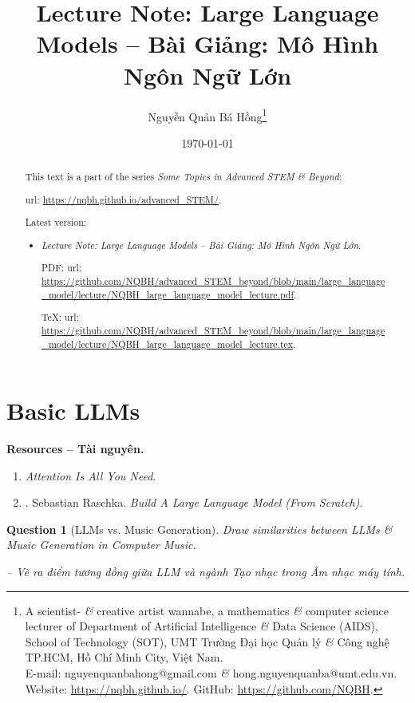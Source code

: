 \documentclass{article}
\title{Lecture Note: Large Language Models -- Bài Giảng: Mô Hình Ngôn Ngữ Lớn}
\author{Nguyễn Quản Bá Hồng\footnote{A scientist- {\it\&} creative artist wannabe, a mathematics {\it\&} computer science lecturer of Department of Artificial Intelligence {\it\&} Data Science (AIDS), School of Technology (SOT), UMT Trường Đại học Quản lý {\it\&} Công nghệ TP.HCM, Hồ Chí Minh City, Việt Nam.\\E-mail: {\sf nguyenquanbahong@gmail.com} {\it\&} {\sf hong.nguyenquanba@umt.edu.vn}. Website: \url{https://nqbh.github.io/}. GitHub: \url{https://github.com/NQBH}.}}
\date{\today}
\newtheorem{question}{Question}
\begin{document}
\maketitle
\begin{abstract}
	This text is a part of the series {\it Some Topics in Advanced STEM \& Beyond}:
	
	{\sc url}: \url{https://nqbh.github.io/advanced_STEM/}.
	
	Latest version:
	\begin{itemize}
		\item {\it Lecture Note: Large Language Models -- Bài Giảng: Mô Hình Ngôn Ngữ Lớn}.
		
		PDF: {\sc url}: \url{https://github.com/NQBH/advanced_STEM_beyond/blob/main/large_language_model/lecture/NQBH_large_language_model_lecture.pdf}.
		
		\TeX: {\sc url}: \url{https://github.com/NQBH/advanced_STEM_beyond/blob/main/large_language_model/lecture/NQBH_large_language_model_lecture.tex}.
	\end{itemize}
\end{abstract}
\tableofcontents


\section{Basic LLMs}
\textbf{\textsf{Resources -- Tài nguyên.}}
\begin{enumerate}
	\item {\it Attention Is All You Need}.
	
	\item \cite{Raschka2024}. {\sc Sebastian Raschka}. {\it Build A Large Language Model (From Scratch)}.
\end{enumerate}

\begin{question}[LLMs vs. Music Generation]
	Draw similarities between LLMs \& Music Generation in Computer Music.
	
	-- Vẽ ra điểm tương đồng giữa LLM và ngành Tạo nhạc trong Âm nhạc máy tính.
\end{question}
\end{document}
